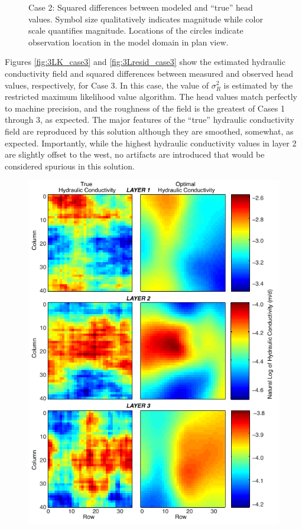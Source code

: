 \documentclass[11pt,oneside,onecolumn]{usgsreport}
\begin{document}
\begin{appendix}
\begin{figure}[H]
\caption{\label{fig:3Lresid_case2}Case 2: Squared differences between modeled
and ``true'' head values. Symbol size qualitatively indicates magnitude
while color scale quantifies magnitude. Locations of the circles indicate
observation location in the model domain in plan view.}
\end{figure}


Figures \ref{fig:3LK_case3} and \ref{fig:3Lresid_case3} show the
estimated hydraulic conductivity field and squared differences between
measured and observed head values, respectively, for Case 3. In this
case, the value of $\sigma_{R}^{2}$ is estimated by the restricted
maximum likelihood value algorithm. The head values match perfectly
to machine precision, and the roughness of the field is the greatest
of Cases 1 through 3, as expected. The major features of the ``true''
hydraulic conductivity field are reproduced by this solution although
they are smoothed, somewhat, as expected. Importantly, while the highest
hydraulic conductivity values in layer 2 are slightly offset to the
west, no artifacts are introduced that would be considered spurious
in this solution.

\begin{figure}[H]
\begin{center}\includegraphics{figures/3KL_case3}\end{center}


\end{figure}
\end{appendix}
\end{document}
